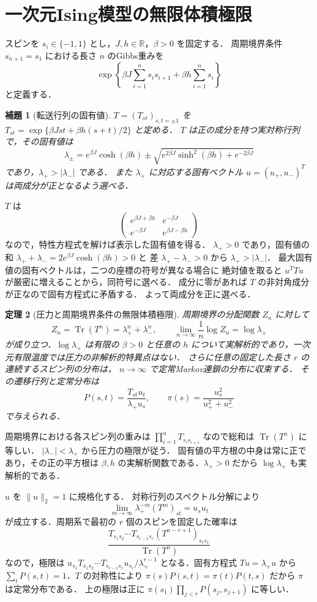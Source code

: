 \documentclass[a5paper,10pt,onecolumn]{jsarticle}
\makeatletter
\theoremstyle{mathnotetheorem}
\newtheorem{theorem}{定理}[section]
\newtheorem{lemma}[theorem]{補題}
\renewcommand{\proofname}{証明}
\renewenvironment{proof}[1][\proofname]{%
  \par\pushQED{\qed}\normalfont\topsep4\p@\@plus2\p@\relax
  \trivlist\item[\hskip\labelsep\bfseries #1]\ignorespaces
}{\popQED\endtrivlist\@endpefalse}
\newcommand{\norm}[1]{\lVert #1\rVert}
\makeatother
\begin{document}
\section{一次元Ising模型の無限体積極限}
スピンを $s_i\in\{-1,1\}$ とし，$J,h\in\mathbb R$，$\beta>0$ を固定する．
周期境界条件 $s_{n+1}=s_1$ における長さ $n$ のGibbs重みを
\[
 \exp\left\{\beta J\sum_{i=1}^n s_is_{i+1}
                +\beta h\sum_{i=1}^ns_i\right\}
\]
と定義する．
\begin{lemma}[転送行列の固有値]
$T=(T_{st})_{s,t=\pm1}$ を
$T_{st}=\exp\{\beta Jst+\beta h(s+t)/2\}$ と定める．
$T$ は正の成分を持つ実対称行列で，その固有値は
\[
 \lambda_{\pm}=e^{\beta J}\cosh(\beta h)
 \pm\sqrt{e^{2\beta J}\sinh^2(\beta h)+e^{-2\beta J}}
\]
であり，$\lambda_+>|\lambda_-|$ である．
また $\lambda_+$ に対応する固有ベクトル
$u=(u_+,u_-)^T$ は両成分が正となるよう選べる．
\end{lemma}
\begin{proof}
$T$ は
\[
 \begin{pmatrix}e^{\beta J+\beta h}&e^{-\beta J}\\
 e^{-\beta J}&e^{\beta J-\beta h}\end{pmatrix}
\]
なので，特性方程式を解けば表示した固有値を得る．
$\lambda_+>0$ であり，固有値の和
$\lambda_++\lambda_-=2e^{\beta J}\cosh(\beta h)>0$ と
差 $\lambda_+-\lambda_->0$ から $\lambda_+>|\lambda_-|$．
最大固有値の固有ベクトルは，二つの座標の符号が異なる場合に
絶対値を取ると $u^TTu$ が厳密に増えることから，同符号に選べる．
成分に零があれば $T$ の非対角成分が正なので固有方程式に矛盾する．
よって両成分を正に選べる．
\end{proof}
\begin{theorem}[圧力と周期境界条件の無限体積極限]
周期境界の分配関数 $Z_n$ に対して
\[
 Z_n=\operatorname{Tr}(T^n)=\lambda_+^n+\lambda_-^n,
 \qquad\lim_{n\to\infty}\frac1n\log Z_n=\log\lambda_+
\]
が成り立つ．$\log\lambda_+$ は有限の $\beta>0$ と任意の $h$
について実解析的であり，一次元有限温度では圧力の非解析的特異点はない．
さらに任意の固定した長さ $r$ の連続するスピン列の分布は，
$n\to\infty$ で定常Markov連鎖の分布に収束する．
その遷移行列と定常分布は
\[
 P(s,t)=\frac{T_{st}u_t}{\lambda_+u_s},\qquad
 \pi(s)=\frac{u_s^2}{u_+^2+u_-^2}
\]
で与えられる．
\end{theorem}
\begin{proof}
周期境界における各スピン列の重みは
$\prod_{i=1}^n T_{s_is_{i+1}}$ なので総和は
$\operatorname{Tr}(T^n)$ に等しい．
$|\lambda_-|<\lambda_+$ から圧力の極限が従う．
固有値の平方根の中身は常に正であり，その正の平方根は
$\beta,h$ の実解析関数である．$\lambda_+>0$ だから
$\log\lambda_+$ も実解析的である．

$u$ を $\norm{u}_2=1$ に規格化する．
対称行列のスペクトル分解により
\[
 \lim_{m\to\infty}\lambda_+^{-m}(T^m)_{st}=u_su_t
\]
が成立する．周期系で最初の $r$ 個のスピンを固定した確率は
\[
 \frac{T_{s_1s_2}\cdots T_{s_{r-1}s_r}
 (T^{n-r+1})_{s_rs_1}}{\operatorname{Tr}(T^n)}
\]
なので，極限は
$u_{s_1}T_{s_1s_2}\cdots T_{s_{r-1}s_r}u_{s_r}/\lambda_+^{r-1}$
となる．固有方程式 $Tu=\lambda_+u$ から
$\sum_tP(s,t)=1$．$T$ の対称性により
$\pi(s)P(s,t)=\pi(t)P(t,s)$ だから $\pi$ は定常分布である．
上の極限は正に $\pi(s_1)\prod_{j<r}P(s_j,s_{j+1})$ に等しい．
\end{proof}
\end{document}
